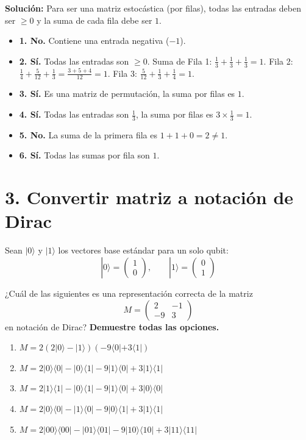 \documentclass[11pt,a4paper]{article}
\begin{document}
\vspace{0.5em}
\textbf{Solución:}
Para ser una matriz estocástica (por filas), todas las entradas deben ser $\geq 0$ y la suma de cada fila debe ser $1$.
\begin{itemize}
    \item \textbf{1. No.} Contiene una entrada negativa ($-1$).
    \item \textbf{2. Sí.} Todas las entradas son $\geq 0$. Suma de Fila 1: $\frac{1}{3}+\frac{1}{3}+\frac{1}{3}=1$. Fila 2: $\frac{1}{4}+\frac{5}{12}+\frac{1}{3}=\frac{3+5+4}{12}=1$. Fila 3: $\frac{5}{12}+\frac{1}{3}+\frac{1}{4}=1$.
    \item \textbf{3. Sí.} Es una matriz de permutación, la suma por filas es $1$.
    \item \textbf{4. Sí.} Todas las entradas son $\frac{1}{3}$, la suma por filas es $3 \times \frac{1}{3} = 1$.
    \item \textbf{5. No.} La suma de la primera fila es $1+1+0=2 \neq 1$.
    \item \textbf{6. Sí.} Todas las sumas por fila son $1$.
\end{itemize}

\section*{3. Convertir matriz a notación de Dirac}

Sean $|0\rangle$ y $|1\rangle$ los vectores base estándar para un solo qubit:
$$|0\rangle= \begin{pmatrix} 1\\ 0 \end{pmatrix}, \qquad |1\rangle= \begin{pmatrix} 0\\ 1 \end{pmatrix}$$

¿Cuál de las siguientes es una representación correcta de la matriz
$$M= \begin{pmatrix} 2 & -1\\ -9 & 3 \end{pmatrix}$$
en notación de Dirac? \textbf{Demuestre todas las opciones.}

\begin{enumerate}
    \item $M= 2(2|0\rangle-|1\rangle) (-9\langle0|+3\langle1|)$
    \item $M= 2|0\rangle\langle0| -|0\rangle\langle1| -9|1\rangle\langle0| +3|1\rangle\langle1|$
    \item $M= 2|1\rangle\langle1| -|0\rangle\langle1| -9|1\rangle\langle0| +3|0\rangle\langle0|$
    \item $M= 2|0\rangle\langle0| -|1\rangle\langle0| -9|0\rangle\langle1| +3|1\rangle\langle1|$
    \item $M= 2|00\rangle\langle00| -|01\rangle\langle01| -9|10\rangle\langle10| +3|11\rangle\langle11|$
\end{enumerate}
\end{document}
